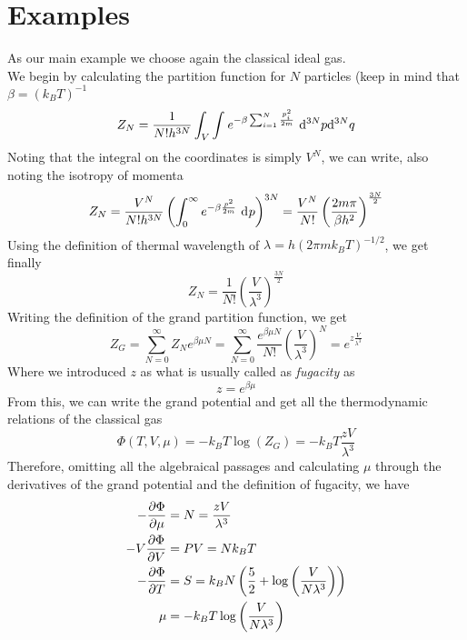 \documentclass[../qm.tex]{subfiles}
\begin{document}
	\section{Examples}
	As our main example we choose again the classical ideal gas.\\
	We begin by calculating the partition function for $N$ particles (keep in mind that $\beta=(k_BT)^{-1}$
	\begin{equation}
		Z_N=\frac{1}{N!h^{3N}}\int_{V}\int_{}^{}e^{-\beta\sum_{i=1}^N\frac{p_i^2}{2m}}\ddiff[3N]{p}{q}
		\label{eq:partitionfunctioncggc}
	\end{equation}
	Noting that the integral on the coordinates is simply $V^N$, we can write, also noting the isotropy of momenta
	\begin{equation}
		Z_N=\frac{V^N}{N!h^{3N}}\left( \int_{0}^{\infty}e^{-\beta\frac{p^2}{2m}}\diff{p} \right)^{3N}=\frac{V^N}{N!}\left( \frac{2m\pi}{\beta h^2} \right)^{\frac{3N}{2}}
		\label{eq:cgnpart}
	\end{equation}
	Using the definition of thermal wavelength of $\lambda=h(2\pi mk_BT)^{-1/2}$, we get finally
	\begin{equation}
		Z_N=\frac{1}{N!}\left( \frac{V}{\lambda^3} \right)^{\frac{3N}{2}}
		\label{eq:partitionfunctionlambda}
	\end{equation}
	Writing the definition of the grand partition function, we get
	\begin{equation}
		Z_G=\sum_{N=0}^{\infty}Z_Ne^{\beta\mu N}=\sum_{N=0}^{\infty}\frac{e^{\beta\mu N}}{N!}\left( \frac{V}{\lambda^3} \right)^{N}=e^{z\frac{V}{\lambda^3}}
		\label{eq:grandcanonicalpartcg}
	\end{equation}
	Where we introduced $z$ as what is usually called as \textit{fugacity} as
	\begin{equation}
		z=e^{\beta\mu}
		\label{eq:fugacitydef}
	\end{equation}
	From this, we can write the grand potential and get all the thermodynamic relations of the classical gas
	\begin{equation}
		\Phi(T,V,\mu)=-k_BT\log(Z_G)=-k_BT\frac{zV}{\lambda^3}
		\label{eq:grandpotential}
	\end{equation}
	Therefore, omitting all the algebraical passages and calculating $\mu$ through the derivatives of the grand potential and the definition of fugacity, we have
	\begin{equation}
		\begin{aligned}
			-\pdv{\Phi}{\mu}&=N=\frac{zV}{\lambda^3}\\
			-V\pdv{\Phi}{V}&=PV=Nk_BT\\
			-\pdv{\Phi}{T}&=S=k_BN\left( \frac{5}{2}+\log\left( \frac{V}{N\lambda^3} \right) \right)\\
			\mu&=-k_BT\log\left( \frac{V}{N\lambda^3} \right)
		\end{aligned}
		\label{eq:thermodynamicvargcg}
	\end{equation}
\end{document}
